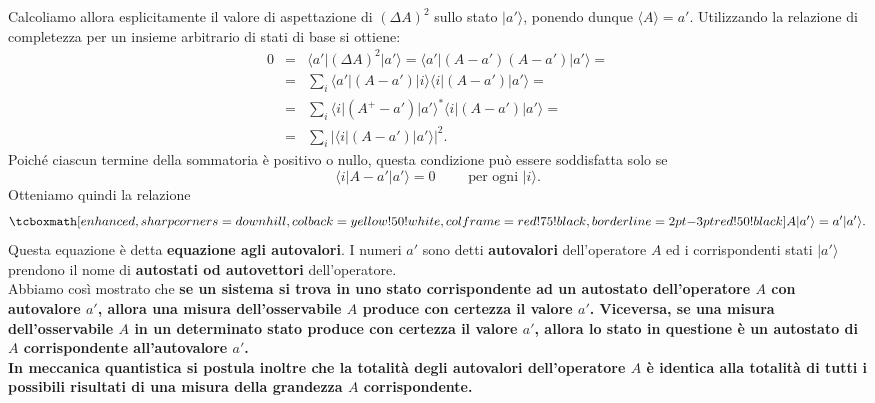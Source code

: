 \documentclass[a4paper,12pt,oneside]{book}
\begin{document}
Calcoliamo allora esplicitamente il valore di aspettazione di $(\Delta A )^2$ sullo stato $\vert a' \rangle$, ponendo dunque $\langle A \rangle = a'$. Utilizzando la relazione di completezza per un insieme arbitrario di stati di base si ottiene:
	\begin{eqnarray}
		0 & = & \langle a' \vert (\Delta A )^2 \vert a'\rangle = \langle a' \vert (A-a' )(A-a') \vert a'\rangle= \nonumber \\
		& = & \sum _i \langle a' \vert (A-a' ) \vert i \rangle \langle i \vert (A-a' ) \vert a' \rangle = \nonumber \\
		& = & \sum _i \langle i \vert (A^{+}-a' ) \vert a' \rangle ^* \langle i \vert (A-a' ) \vert a' \rangle = \nonumber \\
		& = & \sum _i \vert \langle i \vert (A-a' ) \vert a' \rangle \vert ^2.
	\end{eqnarray}
Poiché ciascun termine della sommatoria è positivo o nullo, questa condizione può essere soddisfatta solo se
	\begin{equation}
		\langle i \vert A-a' \vert a' \rangle =0 \qquad \textrm{ per ogni } \vert i \rangle .
	\end{equation}
Otteniamo quindi la relazione
	\begin{equation}
		\tcboxmath[enhanced,sharp corners=downhill ,colback=yellow!50!white,colframe=red!75!black, borderline={2pt}{-3pt}{red!50!black}]{
			A \vert a' \rangle =a' \vert a' \rangle .
			}
	\end{equation}
Questa equazione è detta \textbf{equazione agli autovalori}. I numeri $a'$ sono detti \textbf{autovalori} dell'operatore $A$ ed i corrispondenti stati $\vert a' \rangle $ prendono il nome di \textbf{autostati od autovettori} dell'operatore.\\

Abbiamo così mostrato che \textbf{se un sistema si trova in uno stato corrispondente ad un autostato dell'operatore $A$ con autovalore $a'$, allora una misura dell'osservabile $A$ produce con certezza il valore $a'$. Viceversa, se una misura dell'osservabile $A$ in un determinato stato produce con certezza il valore $a'$, allora lo stato in questione è un autostato di $A$ corrispondente all'autovalore $a'$.}\\

\textbf{In meccanica quantistica si postula inoltre che la totalità degli autovalori dell'operatore $A$ è identica alla totalità di tutti i possibili risultati di una misura della grandezza $A$ corrispondente.}\\
\end{document}
